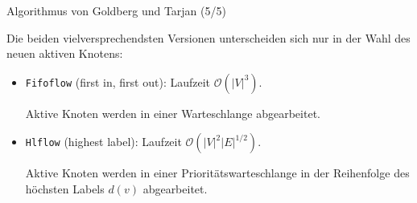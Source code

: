 \documentclass[aspectratio=169]{beamer}
\begin{document}
\begin{frame}{Algorithmus von Goldberg und Tarjan (5/5)}

  Die beiden vielversprechendsten Versionen unterscheiden sich
  nur in der Wahl des neuen aktiven Knotens:

  \begin{itemize}
    \item \texttt{Fifoflow} (first in, first out): Laufzeit $\mathcal{O}(|V|^3)$.
    
    Aktive Knoten werden in einer Warteschlange abgearbeitet.
      
    

    \item \texttt{Hlflow} (highest label): Laufzeit $\mathcal{O}(|V|^2|E|^{1/2})$.
    
    Aktive Knoten werden in einer Prioritätswarteschlange 
    in der Reihenfolge des höchsten Labels $d(v)$ abgearbeitet.
      
    
  \end{itemize} 
  
  
\end{frame}
\end{document}
